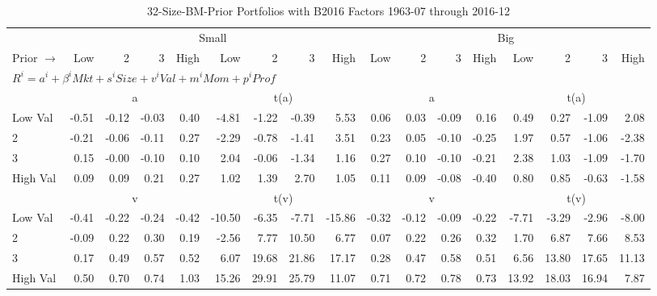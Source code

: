 
\begin{table}[!ht]
\footnotesize
\centering
\caption{32-Size-BM-Prior Portfolios with B2016 Factors 1963-07 through 2016-12}
\begin{tabular}{lrrrrrrrrrrrrrrrr}
  \toprule
    & \multicolumn{8}{c}{Small} & \multicolumn{8}{c}{Big} \\
      \cmidrule(r){2-9} \cmidrule(r){10-17}
    Prior $\rightarrow$ & Low & 2 & 3 & High & Low & 2 & 3 & High & Low & 2 & 3 & High & Low & 2 & 3 & High \\ 
  \midrule
  \multicolumn{17}{l}{$R^i=a^i+\beta^iMkt+s^iSize+v^iVal+m^iMom+p^iProf$} \\

  
    
      & \multicolumn{4}{c}{a} & \multicolumn{4}{c}{t(a)}
    
      & \multicolumn{4}{c}{a} & \multicolumn{4}{c}{t(a)}
    
    \\
      \cmidrule(r){2-5} \cmidrule(r){6-9} \cmidrule(r){10-13} \cmidrule(r){14-17}

    Low Val   & -0.51  & -0.12  & -0.03  & 0.40  & -4.81  & -1.22  & -0.39  & 5.53  & 0.06  & 0.03  & -0.09  & 0.16  & 0.49  & 0.27  & -1.09  & 2.08  \\
           2  & -0.21  & -0.06  & -0.11  & 0.27  & -2.29  & -0.78  & -1.41  & 3.51  & 0.23  & 0.05  & -0.10  & -0.25  & 1.97  & 0.57  & -1.06  & -2.38  \\
           3  & 0.15  & -0.00  & -0.10  & 0.10  & 2.04  & -0.06  & -1.34  & 1.16  & 0.27  & 0.10  & -0.10  & -0.21  & 2.38  & 1.03  & -1.09  & -1.70  \\
    High Val  & 0.09  & 0.09  & 0.21  & 0.27  & 1.02  & 1.39  & 2.70  & 1.05  & 0.11  & 0.09  & -0.08  & -0.40  & 0.80  & 0.85  & -0.63  & -1.58  \\

  
    
      & \multicolumn{4}{c}{v} & \multicolumn{4}{c}{t(v)}
    
      & \multicolumn{4}{c}{v} & \multicolumn{4}{c}{t(v)}
    
    \\
      \cmidrule(r){2-5} \cmidrule(r){6-9} \cmidrule(r){10-13} \cmidrule(r){14-17}

    Low Val   & -0.41  & -0.22  & -0.24  & -0.42  & -10.50  & -6.35  & -7.71  & -15.86  & -0.32  & -0.12  & -0.09  & -0.22  & -7.71  & -3.29  & -2.96  & -8.00  \\
           2  & -0.09  & 0.22  & 0.30  & 0.19  & -2.56  & 7.77  & 10.50  & 6.77  & 0.07  & 0.22  & 0.26  & 0.32  & 1.70  & 6.87  & 7.66  & 8.53  \\
           3  & 0.17  & 0.49  & 0.57  & 0.52  & 6.07  & 19.68  & 21.86  & 17.17  & 0.28  & 0.47  & 0.58  & 0.51  & 6.56  & 13.80  & 17.65  & 11.13  \\
    High Val  & 0.50  & 0.70  & 0.74  & 1.03  & 15.26  & 29.91  & 25.79  & 11.07  & 0.71  & 0.72  & 0.78  & 0.73  & 13.92  & 18.03  & 16.94  & 7.87  \\


\end{tabular}
\end{table}
